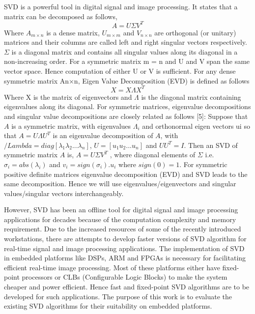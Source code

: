 SVD is a powerful tool in digital signal and image processing. It states that a
matrix can be decomposed as follows,
\begin{equation}
A=U \Sigma V^T
\end{equation}
Where $A_{m×n}$ is a dense matrix, $U_{m×m}$ and $V_{n×n}$ are orthogonal (or unitary) matrices and their columns are called left and right singular vectors respectively.
$\Sigma$ is a diagonal matrix and contains all singular values along its diagonal in a
non-increasing order. For a symmetric matrix m = n and U and V span the
same vector space. Hence computation of either U or V is sufficient. For any
dense symmetric matrix An×n, Eigen Value Decomposition (EVD) is defined as
follows
\begin{equation}
X=X \Lambda X^T
\end{equation}
Where X is the matrix of eigenvectors and $\Lambda$ is the diagonal matrix containing
eigenvalues along its diagonal. For symmetric matrices, eigenvalue decompositions
and singular value decompositions are closely related as follows [5]:
Suppose that $A$ is a symmetric matrix, with eigenvalues $\Lambda_i$ and orthonormal
eigen vectors ui so that $A=U \Lambda U^T$
is an eigenvalue decomposition of $A$, with
$/Lambda = diag[ \lambda{_1} \lambda{_2}...\lambda{_n}]$, $U = [u_1 u_2...u_n]$ and $UU^T = I$. Then an SVD of symmetric
matrix $A$ is, $A = U \Sigma V^T$
, where diagonal elements of $\Sigma$ i.e. $\sigma_i = abs(\lambda_i)$ and
$v_i = sign(\sigma_i).u_i$ where $sign(0) = 1$. For symmetric positive definite matrices
eigenvalue decomposition (EVD) and SVD leads to the same decomposition.
Hence we will use eigenvalues/eigenvectors and singular values/singular vectors
interchangeably.\par
However, SVD has been an offline tool for digital signal and image processing
applications for decades because of the computation complexity and memory
requirement. Due to the increased resources of some of the recently introduced
workstations, there are attempts to develop faster versions of SVD algorithm
for real-time signal and image processing applications. The implementation of
SVD in embedded platforms like DSPs, ARM and FPGAs is necessary for facilitating
efficient real-time image processing. Most of these platforms either have
fixed-point processors or CLBs (Configurable Logic Blocks) to make the system
cheaper and power efficient. Hence fast and fixed-point SVD algorithms are to
be developed for such applications. The purpose of this work is to evaluate the
existing SVD algorithms for their suitability on embedded platforms.\par
